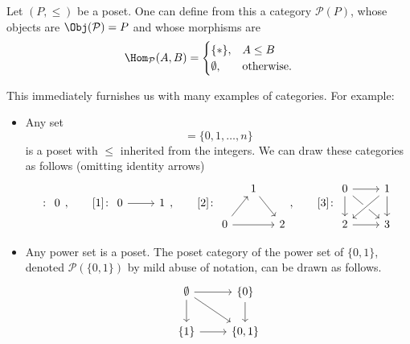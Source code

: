 \documentclass[notes.tex]{subfiles}
\begin{document}
\begin{example}
  \label{eg:poset_category}
  Let $(P, \leq)$ be a poset. One can define from this a category $\mathcal{P}(P)$, whose objects are $\Obj(\mathcal{P}) = P$ and whose morphisms are
  \begin{equation*}
    \Hom_{\mathcal{P}}(A, B) =
    \begin{cases}
      \{*\}, & A \leq B \\
      \emptyset, & \text{otherwise}.
    \end{cases}
  \end{equation*}

  This immediately furnishes us with many examples of categories. For example:
  \begin{itemize}
    \item Any set
      \begin{equation*}
        [n] = \{0, 1, \ldots, n\}
      \end{equation*}
      is a poset with $\leq$ inherited from the integers. We can draw these categories as follows (omitting identity arrows)
      \begin{equation*}
        [0]\colon
        \begin{tikzcd}
          0
        \end{tikzcd}
        ,\qquad
        [1]\colon
        \begin{tikzcd}
          0
          \arrow[r]
          & 1
        \end{tikzcd}
        ,\qquad[2]\colon
        \begin{tikzcd}[column sep=small]
          & 1
          \arrow[dr]
          \\
          0
          \arrow[ur]
          \arrow[rr]
          & & 2
        \end{tikzcd}
        ,\qquad[3]\colon
        \begin{tikzcd}
          0 
          \arrow[r]
          \arrow[d]
          \arrow[rd]
          & 1
          \arrow[d]
          \arrow[dl, crossing over]
          \\
          2
          \arrow[r]
          & 3
        \end{tikzcd}
      \end{equation*}

    \item Any power set is a poset. The poset category of the power set of $\{0, 1\}$, denoted $\mathcal{P}(\{0, 1\})$ by mild abuse of notation, can be drawn as follows.
      \begin{equation*}
        \begin{tikzcd}
          \emptyset
          \arrow[dr]
          \arrow[r]
          \arrow[d]
          & \{0\}
          \arrow[d]
          \\
          \{1\}
          \arrow[r]
          & \{0, 1\}
        \end{tikzcd}
      \end{equation*}


\end{itemize}
\end{example}
\end{document}
